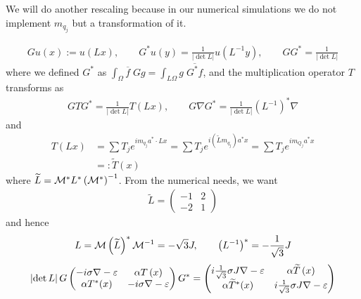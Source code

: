\documentclass[11pt,a4paper,reqno,french,tikz]{amsart}
\newcommand{\pa}[1]{\left( #1 \right)} %
\newcommand{\ab}[1]{\left|#1\right|} %
\newcommand{\na}{\nabla} %
\newcommand{\f}[2]{\frac{#1}{#2}} %
\newcommand{\mat}[1]{\begin{pmatrix} #1 \end{pmatrix}} %
\begin{document}
We will do another rescaling because in our numerical simulations we do not implement $m_{q_j}$ but a transformation of it.



\begin{align*}
G u(x) := u\pa{Lx}, \qquad G ^*u(y) = \f{1}{\ab{\det L}} u\pa{ L^{-1}y}, \qquad G  G ^* = \f{1}{\ab{\det L}}
\end{align*}
where we defined $G ^*$ as $\int_\Omega \overline{f} \; G g = \int_{L\Omega} g \; \overline{G ^*f}$, and the multiplication operator $T$ transforms as
\begin{align*}
G  T G ^* = \f{1}{\ab{\det L}} T\pa{Lx}, \qquad G  \na G ^* = \f{1}{\ab{\det L}} \pa{L^{-1}}^* \na
\end{align*}
and
\begin{align*}
	T\pa{Lx} &= \sum T_j e^{i m_{q_j} a^* \cdot Lx} = \sum T_j e^{i\pa{\widetilde{L} m_{q_j}} a^* x} = \sum T_j e^{i m_{Q_j} a^* x} \\
&=: \widetilde{T}(x)
\end{align*}
where $\widetilde{L} = \cM^* L^* \pa{\cM^*}^{-1}$. From the numerical needs, we want
\begin{align*}
\widetilde{L} = \mat{-1 & 2 \\ -2 & 1}
\end{align*}
and hence
\begin{align*}
L = \cM \pa{\widetilde{L}}^* \cM^{-1} = -\sqrt 3  J, \qquad \pa{L^{-1}}^* = -\f{1}{\sqrt{3}} J
\end{align*}
\begin{align*}
\ab{\det L} G \mat{-i\sigma \na - \ep & \alpha T\pa{x} \\ \alpha T^*(x) & -i\sigma \na - \ep}  G ^* = \mat{ i\f{1}{\sqrt 3}\sigma  J \na - \ep & \alpha \widetilde{T}\pa{x} \\ \alpha \widetilde{T}^*(x) &  i\f{1}{\sqrt 3}\sigma J \na - \ep}
\end{align*}









\end{document}
